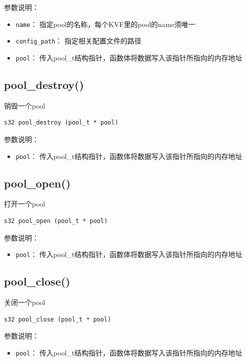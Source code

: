 		参数说明：
		\begin{itemize}
		\item \verb|name|：
			指定pool的名称，每个KVF里的pool的name须唯一
		\item \verb|config_path|：
			指定相关配置文件的路径
		\item \verb|pool|：
			传入pool\_t结构指针，函数体将数据写入该指针所指向的内存地址		
		\end{itemize}
		

	\subsection{pool\_destroy()}
		销毁一个pool
		\begin{Verbatim}[frame = none]
    s32 pool_destroy (pool_t * pool)
		\end{Verbatim}

		参数说明：
		\begin{itemize}
		\item \verb|pool|：
			传入pool\_t结构指针，函数体将数据写入该指针所指向的内存地址
		\end{itemize}


	\subsection{pool\_open()}
		打开一个pool
		\begin{Verbatim}[frame = none]
    s32 pool_open (pool_t * pool)
		\end{Verbatim}		

		参数说明：
		\begin{itemize}
		\item \verb|pool|：
			传入pool\_t结构指针，函数体将数据写入该指针所指向的内存地址
		\end{itemize}


	\subsection{pool\_close()}
		关闭一个pool
		\begin{Verbatim}[frame = none]
    s32 pool_close (pool_t * pool)
		\end{Verbatim}		

		参数说明：
		\begin{itemize}
		\item \verb|pool|：
			传入pool\_t结构指针，函数体将数据写入该指针所指向的内存地址
		\end{itemize}


